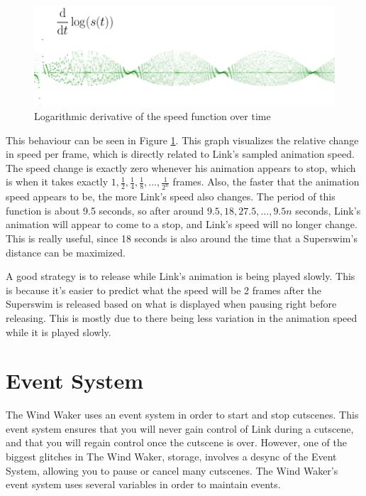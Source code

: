 \documentclass[titlepage,12pt,a4paper]{article}
\let\stdsection\section
\renewcommand\section{\newpage\stdsection}
\begin{document}
\begin{figure}[!htb]
	\centering
	\includegraphics[width=\textwidth]{SSDerivative}
	\caption{Logarithmic derivative of the speed function over time}
	\label{fig:SSDerivative}
\end{figure}

This behaviour can be seen in Figure \ref{fig:SSDerivative}. This graph visualizes the relative change in speed per frame, which is directly related to Link's sampled animation speed. The speed change is exactly zero whenever his animation appears to stop, which is when it takes exactly $1, \frac{1}{2}, \frac{1}{4}, \frac{1}{8}, \ldots, \frac{1}{2^n}$ frames. Also, the faster that the animation speed appears to be, the more Link's speed also changes. The period of this function is about 9.5 seconds, so after around $9.5, 18, 27.5, \ldots, 9.5 n$ seconds, Link's animation will appear to come to a stop, and Link's speed will no longer change. This is really useful, since 18 seconds is also around the time that a Superswim's distance can be maximized.

A good strategy is to release while Link's animation is being played slowly. This is because it's easier to predict what the speed will be 2 frames after the Superswim is released based on what is displayed when pausing right before releasing. This is mostly due to there being less variation in the animation speed while it is played slowly.

\section{Event System}
The Wind Waker uses an event system in order to start and stop cutscenes. This event system ensures that you will never gain control of Link during a cutscene, and that you will regain control once the cutscene is over. However, one of the biggest glitches in The Wind Waker, storage, involves a desync of the Event System, allowing you to pause or cancel many cutscenes. The Wind Waker's event system uses several variables in order to maintain events.
\end{document}
